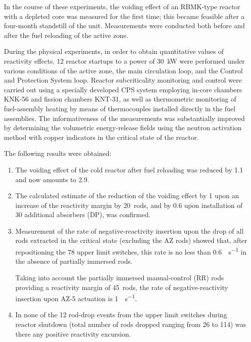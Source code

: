 \documentclass[openright]{bookest}
\begin{document}
In the course of these experiments, the voiding effect of an RBMK-type reactor with a depleted core was measured for the first time; this became feasible after a four-month standstill of the unit. Measurements were conducted both before and after the fuel reloading of the active zone.

During the physical experiments, in order to obtain quantitative values of reactivity effects, 12 reactor startups to a power of \qty{30}{\kilo\watt} were performed under various conditions of the active zone, the main circulation loop, and the Control and Protection System loop. Reactor subcriticality monitoring and control were carried out using a specially developed CPS system employing in-core chambers KNK-56 and fission chambers KNT-31, as well as thermometric monitoring of fuel-assembly heating by means of thermocouples installed directly in the fuel assemblies. The informativeness of the measurements was substantially improved by determining the volumetric energy-release fields using the neutron activation method with copper indicators in the critical state of the reactor.

The following results were obtained:

\begin{enumerate}
\item The voiding effect of the cold reactor after fuel reloading was reduced by \qty{1.1}{\betaeff} and now amounts to \qty{2.9}{\betaeff}.

\item The calculated estimate of the reduction of the voiding effect by \qty{1}{\betaeff} upon an increase of the reactivity margin by 20~rods, and by \qty{0.6}{\betaeff} upon installation of 30 additional absorbers (DP), was confirmed.

\item Measurement of the rate of negative-reactivity insertion upon the drop of all rods extracted in the critical state (excluding the AZ rods) showed that, after repositioning the 78 upper limit switches, this rate is no less than \qty{0.6}{\betaeff\per\second} in the absence of partially immersed rods.

Taking into account the partially immersed manual-control (RR) rods providing a reactivity margin of 45~rods, the rate of negative-reactivity insertion upon AZ-5 actuation is \qty{1}{\betaeff\per\second}.

\item In none of the 12 rod-drop events from the upper limit switches during reactor shutdown (total number of rods dropped ranging from 26 to 114) was there any positive reactivity excursion.
\end{enumerate}
\end{document}
